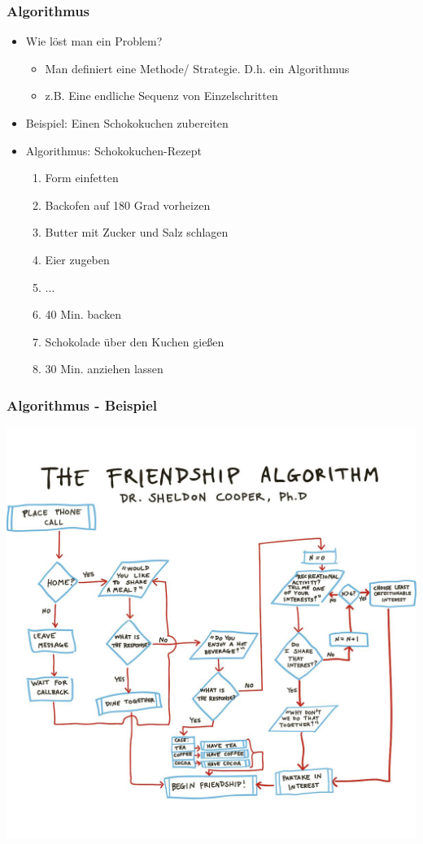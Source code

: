 \documentclass{beamer}
\begin{document}
	\begin{frame}
		\frametitle{Algorithmus}
		\begin{itemize}
			\item Wie löst man ein Problem?
			\begin{itemize}
				\item Man definiert eine Methode/ Strategie. D.h. ein Algorithmus
				\item z.B. Eine endliche Sequenz von Einzelschritten
			\end{itemize} 
			\pause
			\vspace{10pt}
			\item Beispiel: Einen Schokokuchen zubereiten
			\pause
			\vspace{10pt}
			\item Algorithmus: Schokokuchen-Rezept
			\begin{enumerate}
				\item Form einfetten
				\item Backofen auf 180 Grad vorheizen
				\item Butter mit Zucker und Salz schlagen
				\item Eier zugeben
				\item ...
				\item 40 Min. backen
				\item Schokolade über den Kuchen gießen
				\item 30 Min. anziehen lassen
			\end{enumerate}
		\end{itemize}
	\end{frame}

	\begin{frame}
		\frametitle{Algorithmus - Beispiel}
		\centering \includegraphics[height=.9\textheight]{Algorithmus}
	\end{frame}
\end{document}
